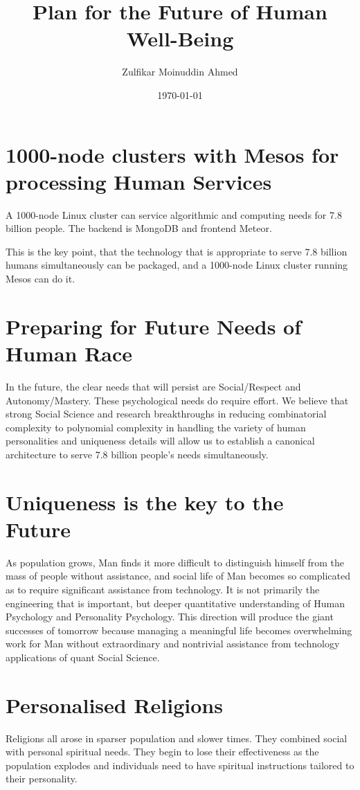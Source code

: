 \documentclass{amsart}
\title{Plan for the Future of Human Well-Being}
\author{Zulfikar Moinuddin Ahmed}
\date{\today}
\begin{document}
\maketitle

\section{1000-node clusters with Mesos for processing Human Services}

A 1000-node Linux cluster can service algorithmic and computing needs for 7.8 billion people.  The backend is MongoDB and frontend Meteor.

This is the key point, that the technology that is appropriate to serve 7.8 billion humans simultaneously can be packaged, and a 1000-node Linux cluster running Mesos can do it.  

\section{Preparing for Future Needs of Human Race}

In the future, the clear needs that will persist are Social/Respect and Autonomy/Mastery.  These psychological needs do require effort.  We believe that strong Social Science and research breakthroughs in reducing combinatorial complexity to polynomial complexity in handling the variety of human personalities and uniqueness details will allow us to establish a canonical architecture to serve 7.8 billion people's needs simultaneously.  

\section{Uniqueness is the key to the Future}

As population grows, Man finds it more difficult to distinguish himself from the mass of people without assistance, and social life of Man becomes so complicated as to require significant assistance from technology.  It is not primarily the engineering that is important, but deeper quantitative understanding of Human Psychology and Personality Psychology.  This direction will produce the giant successes of tomorrow because managing a meaningful life becomes overwhelming work for Man without extraordinary and nontrivial assistance from technology applications of quant Social Science.

\section{Personalised Religions}
Religions all arose in sparser population and slower times.  They combined social with personal spiritual needs.  They begin to lose their effectiveness as the population explodes and individuals need to have spiritual instructions tailored to their personality.
\end{document}
